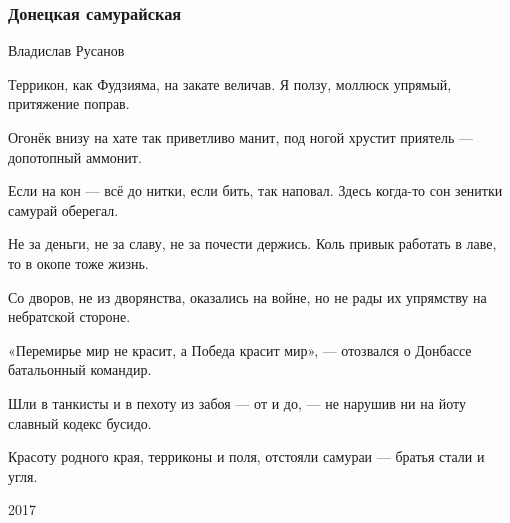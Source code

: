  
 
 

\subsubsection{Донецкая самурайская}

Владислав Русанов

Террикон, как Фудзияма,
на закате величав.
Я ползу, моллюск упрямый,
притяжение поправ.

Огонёк внизу на хате
так приветливо манит,
под ногой хрустит приятель —
допотопный аммонит.

Если на кон — всё до нитки,
если бить, так наповал.
Здесь когда-то сон зенитки
самурай оберегал.

Не за деньги, не за славу,
не за почести держись.
Коль привык работать в лаве,
то в окопе тоже жизнь.

Со дворов, не из дворянства,
оказались на войне,
но не рады их упрямству
на небратской стороне.

«Перемирье мир не красит,
а Победа красит мир», —
отозвался о Донбассе
батальонный командир.

Шли в танкисты и в пехоту
из забоя — от и до, —
не нарушив ни на йоту
славный кодекс бусидо.

Красоту родного края,
терриконы и поля,
отстояли самураи —
братья стали и угля.

2017 
